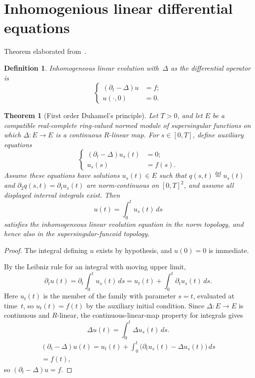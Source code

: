 \documentclass{amsart}
\newtheorem{thm}{Theorem}
\newtheorem{defn}{Definition}
\newcommand{\eqdef}{\overset{\mathrm{def}}{=}}
\begin{document}
\section{Inhomogenious linear differential equations}

Theorem elaborated from~\cite{duhamel-chat}.

\begin{defn}
\emph{Inhomogeneous linear evolution} with~$\Delta$ as the differential operator is
\begin{equation*}
\left\{
\begin{aligned}
(\partial_t - \Delta)u &= f;\\
u({\cdot},0) &= 0.
\end{aligned}
\right.
\end{equation*}
\end{defn}

\begin{thm}[First order Duhamel's principle]
Let $T>0$, and let $E$ be a compatible real-complete ring-valued normed
module of supersingular functions on which $\Delta:E\to E$ is a continuous
$R$-linear map.  For $s\in[0,T]$, define auxiliary equations
\begin{equation*}
\left\{
\begin{aligned}
(\partial_t - \Delta)u_s(t) &= 0;\\
u_s(s) &= f(s).
\end{aligned}
\right.
\end{equation*}
Assume these equations have solutions $u_s(t)\in E$ such that
$q(s,t)\eqdef u_s(t)$ and
$\partial_2q(s,t)=\partial_tu_s(t)$ are norm-continuous on $[0,T]^2$, and
assume all displayed interval integrals exist.  Then
\[
  u(t) = \int_0^t u_s(t)\,ds
\]
satisfies the inhomogeneous linear evolution equation in the norm topology, and
hence also in the supersingular-funcoid topology.
\end{thm}

\begin{proof}
The integral defining $u$ exists by hypothesis, and $u(0)=0$ is immediate.

By the Leibniz rule for an integral with moving upper limit,
\[
  \partial_t u(t)
  =
  \partial_t \int_0^t u_s(t)\,ds
  =
  u_t(t)+\int_0^t \partial_tu_s(t)\,ds .
\]
Here $u_t(t)$ is the member of the family with parameter $s=t$, evaluated at
time~$t$, so $u_t(t)=f(t)$ by the auxiliary initial condition.
Since $\Delta:E\to E$ is continuous and $R$-linear, the continuous-linear-map
property for integrals gives
\[
  \Delta u(t)=\int_0^t \Delta u_s(t)\,ds .
\]
\begin{multline*}
(\partial_t - \Delta)u(t)
= u_t(t)+\int_0^t \bigl(\partial_tu_s(t)-\Delta u_s(t)\bigr)\,ds \\
= f(t),
\end{multline*}
so $(\partial_t - \Delta)u = f$.
\end{proof}
\end{document}
